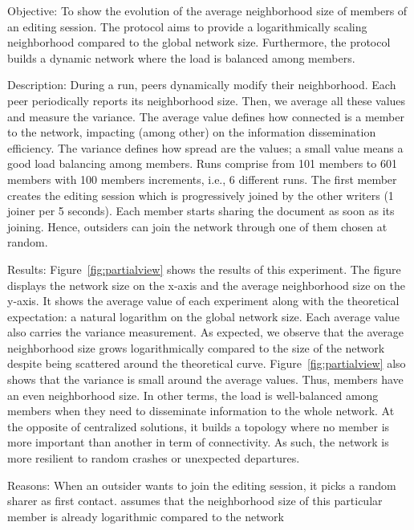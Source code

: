 \begin{asparadesc}
\item [Objective:] To show the evolution of the average neighborhood size of
  members of an editing session. The \SPRAY protocol aims to provide a
  logarithmically scaling neighborhood compared to the global network
  size. Furthermore, the protocol builds a dynamic network where the load is
  balanced among members.
\item [Description:] During a run, peers dynamically modify their
  neighborhood. Each peer periodically reports its neighborhood size. Then, we
  average all these values and measure the variance. The average value defines
  how connected is a member to the network, impacting (among other) on the
  information dissemination efficiency. The variance defines how spread are the
  values; a small value means a good load balancing among members. Runs comprise
  from 101 members to 601 members with 100 members increments, i.e., 6 different
  runs.  The first member creates the editing session which is progressively
  joined by the other writers (1 joiner per 5 seconds). Each member starts
  sharing the document as soon as its joining. Hence, outsiders can join the
  network through one of them chosen at random.
\item [Results:] Figure~\ref{fig:partialview} shows the results of this
  experiment. The figure displays the network size on the x-axis and the average
  neighborhood size on the y-axis. It shows the average value of each experiment
  along with the theoretical expectation: a natural logarithm on the global
  network size. Each average value also carries the variance measurement. As
  expected, we observe that the average neighborhood size grows logarithmically
  compared to the size of the network despite being scattered around the
  theoretical curve. Figure~\ref{fig:partialview} also shows that the variance
  is small around the average values. Thus, members have an even neighborhood
  size. In other terms, the load is well-balanced among members when they need
  to disseminate information to the whole network. At the opposite of
  centralized solutions, it builds a topology where no member is more important
  than another in term of connectivity. As such, the network is more resilient
  to random crashes or unexpected departures.
\item [Reasons:] When an outsider wants to join the editing session, it picks a
  random sharer as first contact. \SPRAY assumes that the neighborhood size of
  this particular member is already logarithmic compared to the network

\end{asparadesc}
